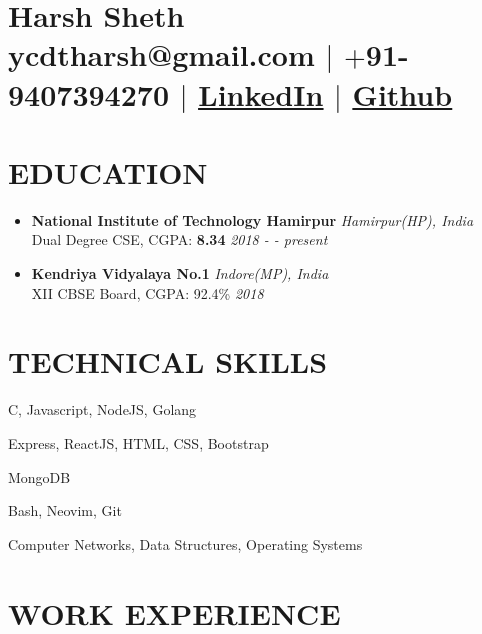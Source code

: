 \documentclass[12pt]{article}
\begin{document}
\section{\Huge{Harsh Sheth}\\ \large \normalfont ycdtharsh@gmail.com $|$ \normalfont $+$91-9407394270 $|$  \underline{\href{https://www.linkedin.com/in/harsh-sheth-2101}{LinkedIn}} $|$ \underline{\href{https://github.com/harsh-sheth}{Github}}}

\section{EDUCATION}
\begin{itemize}
  \item{
      \textbf{National Institute of Technology Hamirpur} \hfill \textit{Hamirpur(HP), India}\\
      Dual Degree CSE, CGPA: \textbf{8.34} \hfill \textit{2018 - - present}
  } 
  \item{
      \textbf{Kendriya Vidyalaya No.1} \hfill \textit{Indore(MP), India}\\
      XII CBSE Board, CGPA: 92.4\% \hfill \textit{2018}
  }
\end{itemize}

\section{TECHNICAL SKILLS}
\begin{description}
  \setlength{\itemindent}{\parindent}
  \setlength{\itemsep}{0em}
  \item[Languages:]{C, Javascript, NodeJS, Golang}
  \item[Web Technologies:]{Express, ReactJS, HTML, CSS, Bootstrap}
  \item[Database:]{MongoDB}
  \item[Tools:]{Bash, Neovim, Git}
  \item[Coursework:]{Computer Networks, Data Structures,  Operating Systems}
\end{description}

\section{WORK EXPERIENCE}
\end{document}
